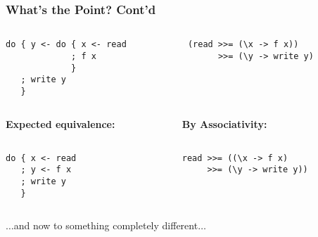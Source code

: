 \documentclass{beamer}
\begin{document}
\begin{frame}[fragile]
\frametitle{What's the Point? Cont'd}
\begin{columns}[t]
{
  \begin{column}{5cm}
\begin{lstlisting}
do { y <- do { x <- read
             ; f x
             }
   ; write y    
   }   
\end{lstlisting}
  \end{column}
  }
  {
  \begin{column}{5cm}
\begin{lstlisting}
(read >>= (\x -> f x)) 
      >>= (\y -> write y)
      
\end{lstlisting}
  \end{column}
  }
\end{columns}
\begin{columns}[t]
  \begin{column}{5cm}
{
  \textbf{Expected equivalence:}
\begin{lstlisting}

do { x <- read
   ; y <- f x
   ; write y 
   }
\end{lstlisting}
}
  \end{column}
  \begin{column}{5cm}
{
\textbf{By Associativity:}
\begin{lstlisting}

read >>= ((\x -> f x) 
     >>= (\y -> write y))
\end{lstlisting}
}
  \end{column}
\end{columns}
\end{frame}


\begin{frame}
\large{$\dots$and now to something completely different$\dots$}
\end{frame}



\end{document}
